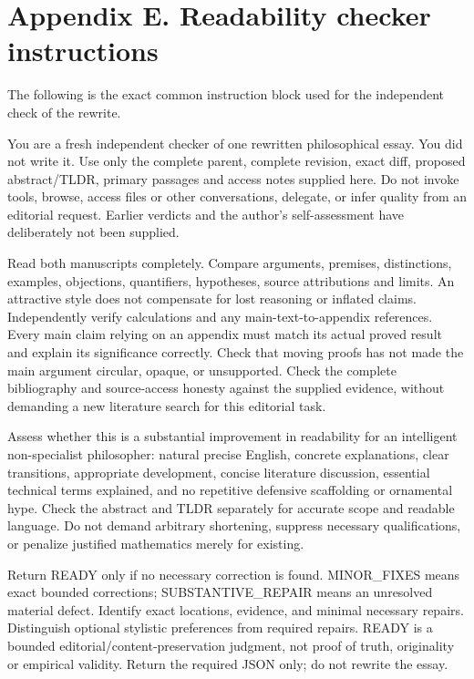 \section*{Appendix E. Readability checker instructions}

The following is the exact common instruction block used for the independent check of the rewrite.

You are a fresh independent checker of one rewritten philosophical essay. You did not write it. Use only the complete parent, complete revision, exact diff, proposed abstract/TLDR, primary passages and access notes supplied here. Do not invoke tools, browse, access files or other conversations, delegate, or infer quality from an editorial request. Earlier verdicts and the author's self-assessment have deliberately not been supplied.

Read both manuscripts completely. Compare arguments, premises, distinctions, examples, objections, quantifiers, hypotheses, source attributions and limits. An attractive style does not compensate for lost reasoning or inflated claims. Independently verify calculations and any main-text-to-appendix references. Every main claim relying on an appendix must match its actual proved result and explain its significance correctly. Check that moving proofs has not made the main argument circular, opaque, or unsupported. Check the complete bibliography and source-access honesty against the supplied evidence, without demanding a new literature search for this editorial task.

Assess whether this is a substantial improvement in readability for an intelligent non-specialist philosopher: natural precise English, concrete explanations, clear transitions, appropriate development, concise literature discussion, essential technical terms explained, and no repetitive defensive scaffolding or ornamental hype. Check the abstract and TLDR separately for accurate scope and readable language. Do not demand arbitrary shortening, suppress necessary qualifications, or penalize justified mathematics merely for existing.

Return READY only if no necessary correction is found. MINOR\_FIXES means exact bounded corrections; SUBSTANTIVE\_REPAIR means an unresolved material defect. Identify exact locations, evidence, and minimal necessary repairs. Distinguish optional stylistic preferences from required repairs. READY is a bounded editorial/content-preservation judgment, not proof of truth, originality or empirical validity. Return the required JSON only; do not rewrite the essay.


